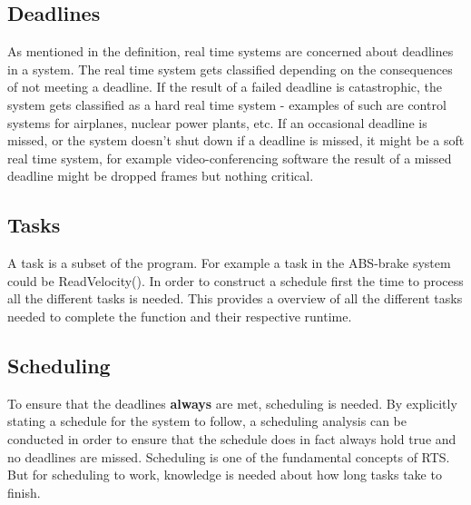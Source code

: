 \subsection{Deadlines}
As mentioned in the definition, real time systems are concerned about
deadlines in a system.
The real time system gets classified depending on the consequences of not
meeting a deadline. If the result of a failed deadline is catastrophic, the
system gets classified as a hard real time system - examples of such are control
systems for airplanes, nuclear power plants, etc.
If an occasional deadline is missed, or the system doesn't shut down if a
deadline is missed, it might be a soft real time system, for example
video-conferencing software the result of a missed deadline might be dropped
frames but nothing critical.

\subsection{Tasks}
A task is a subset of the program. For example a task in the ABS-brake system
could be ReadVelocity(). In order to construct a schedule first the time to
process all the different tasks is needed. This provides a overview of all the
different tasks needed to complete the function and their respective runtime.

\subsection{Scheduling}
To ensure that the deadlines \textbf{always} are met, scheduling is needed.
By explicitly stating a schedule for the system to follow, a scheduling analysis
can be conducted in order to ensure that the schedule does in fact always hold
true and no deadlines are missed. Scheduling is one of the
fundamental concepts of RTS. But for scheduling to work, knowledge is needed
about how long tasks take to finish. 
